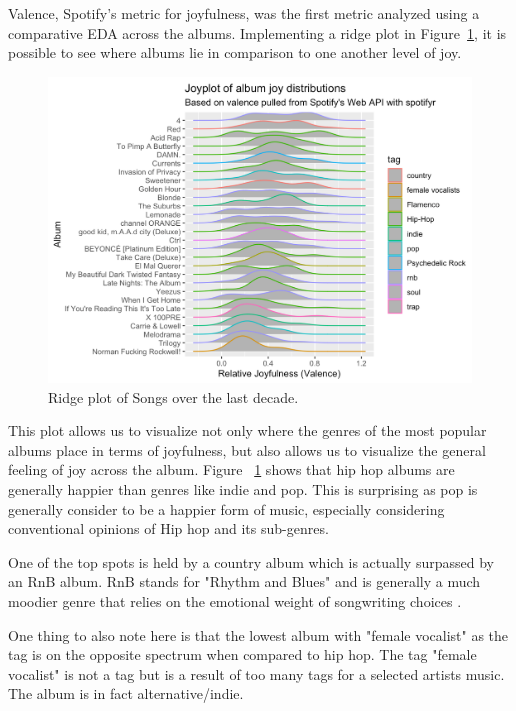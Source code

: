 \documentclass[conference]{IEEEtran}
\begin{document}
Valence, Spotify's metric for joyfulness, was the first metric analyzed using a comparative EDA across the albums. Implementing a ridge plot in Figure~\ref{fig:most-joyful}, it is possible to see where albums lie in comparison to one another level of joy. 

\begin{figure}[htbp]
\centerline{\includegraphics[width=\columnwidth]{spotify-images/most-joyful.png}}
\caption{Ridge plot of Songs over the last decade.}
\label{fig:most-joyful}
\end{figure}

This plot allows us to visualize not only where the genres of the most popular albums place in terms of joyfulness, but also allows us to visualize the general feeling of joy across the album. Figure ~\ref{fig:most-joyful} shows that hip hop albums are generally happier than genres like indie and pop. This is surprising as pop is generally consider to be a happier form of music, especially considering conventional opinions of Hip hop and its sub-genres. 

One of the top spots is held by a country album which is actually surpassed by an RnB album. RnB stands for "Rhythm and Blues" and is generally a much moodier genre that relies on the emotional weight of songwriting choices \cite{b9}. 

One thing to also note here is that the lowest album with "female vocalist" as the tag is on the opposite spectrum when compared to hip hop. The tag "female vocalist" is not a tag but is a result of too many tags for a selected artists music. The album is in fact alternative/indie.
\end{document}
